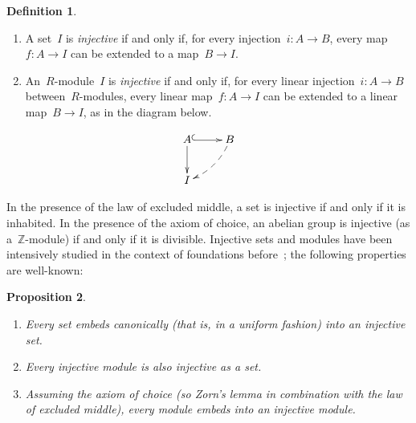 \documentclass[oneside]{amsart}
\theoremstyle{definition}
\newtheorem{defn}{Definition}[section]
\theoremstyle{plain}
\newtheorem{prop}[defn]{Proposition}
\theoremstyle{remark}
\newcommand{\ZZ}{\mathbb{Z}}
\renewcommand{\_}{\mathpunct{.}\,}
\begin{document}
\begin{defn}\begin{enumerate}
\item A set~$I$ is \emph{injective} if and only if, for every injection~$i
: A \to B$, every map~$f : A \to I$ can be extended to a map~$B \to I$.
\item An~$R$-module~$I$ is \emph{injective} if and only if, for every linear
injection~$i : A \to B$ between~$R$-modules, every linear map~$f : A \to I$ can
be extended to a linear map~$B \to I$, as in the diagram below.
\end{enumerate}
\[ \xymatrix{
  A \ar@{^{(}->}[r]\ar[d] & B \ar@{-->}@/^/[ld] \\
  I
} \]
\end{defn}

In the presence of the law of excluded middle, a set is injective if and only
if it is inhabited. In the presence of the axiom of choice, an abelian group is
injective (as a~$\ZZ$-module) if and only if it is divisible. Injective sets
and modules have been intensively studied in the context of foundations
before~\cite{blass:inj-proj-axc,harting:locally-injective,kenney:injective-choice,aczel-berg-granstroem-schuster:injective};
the following properties are well-known:

\begin{prop}\label{prop:basics-injective}
\begin{enumerate}
\item Every set embeds canonically (that is, in a uniform fashion) into an injective set.
\item Every injective module is also injective as a set.
\item Assuming the axiom of choice (so Zorn's lemma in combination with the law of excluded middle), every module embeds into an
injective module.
\end{enumerate}\end{prop}
\end{document}
